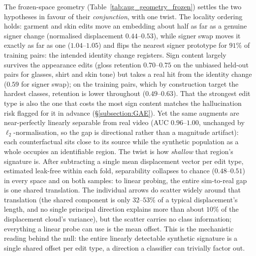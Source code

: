 The frozen-space geometry (Table~\ref{tab:aug_geometry_frozen}) settles
the two hypotheses in favour of their \emph{conjunction}, with one twist.
The locality ordering holds: garment and skin edits move an embedding
about half as far as a genuine signer change (normalised displacement
$0.44$--$0.53$), while signer swap moves it exactly as far as one
($1.04$--$1.05$) and flips the nearest signer prototype for $91\%$ of
training pairs: the intended identity change registers. Sign content
largely survives the appearance edits (gloss retention $0.70$--$0.75$ on
the unbiased held-out pairs for glasses, shirt and skin tone) but takes a
real hit from the identity change ($0.59$ for signer swap); on the
training pairs, which by construction target the hardest classes,
retention is lower throughout ($0.49$--$0.63$). That the strongest edit
type is also the one that costs the most sign content matches the
hallucination risk flagged for it in advance
(\S\ref{subsection:GAE}). Yet the same augments are
near-perfectly linearly separable from real video (AUC $0.96$--$1.00$,
unchanged by $\ell_2$-normalisation, so the gap is directional rather
than a magnitude artifact): each counterfactual sits close to its source
while the synthetic population as a whole occupies an identifiable
region.
The twist is how \emph{shallow} that region's signature is.
After subtracting a single mean displacement vector per edit type,
estimated leak-free within each fold, separability collapses to chance
($0.48$--$0.51$) in every space and on both samples: to linear probing,
the entire sim-to-real gap is one shared translation. The individual
arrows do scatter widely around that translation (the shared
component is only $32$--$53\%$ of a typical displacement's length, and
no single principal direction explains more than about $10\%$ of the
displacement cloud's variance), but the scatter carries no class
information; everything a linear probe can use is the mean offset. This
is the mechanistic reading behind the null: the entire
linearly detectable synthetic signature is a single shared offset per
edit type, a direction a classifier can trivially factor out.

